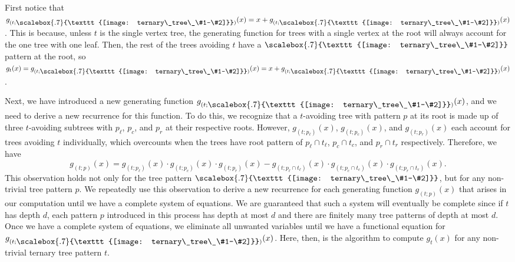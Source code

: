\documentclass[12pt]{article}
\newcommand{\st}[2]{\ensuremath{\vcenter{\hbox{\scalebox{.7}{\texttt{[image: ternary\_tree\_\#1-\#2]}}}}}}
\begin{document}
First notice that $g_{(t; \st{1}{1})}(x) = x + g_{(t;\st{3}{1})}(x)$. This is because, unless $t$ is the single vertex tree, the generating function for trees with a single vertex at the root will always account for the one tree with one leaf.  Then, the rest of the trees avoiding $t$ have a \st{3}{1} pattern at the root, so $g_t(x)=g_{(t; \st{1}{1})}(x) = x + g_{(t;\st{3}{1})}(x)$.

Next, we have introduced a new generating function $g_{(t;\st{3}{1})}(x)$, and we need to derive a new recurrence for this function. To do this, we recognize that a $t$-avoiding tree with pattern $p$ at its root is made up of three $t$-avoiding subtrees with $p_\ell$, $p_c$, and $p_r$ at their respective roots. However, $g_{(t;p_\ell )}(x)$, $g_{(t;p_c)}(x)$, and $g_{(t;p_r)}(x)$ each account for trees avoiding $t$ individually, which overcounts when the trees have root pattern of $p_\ell \cap t_\ell$, $p_c \cap t_c$, and $p_r \cap t_r$ respectively. Therefore, we have $$g_{(t;p)}(x)= g_{(t;p_\ell)}(x) \cdot g_{(t;p_c)}(x) \cdot g_{(t;p_r)}(x) - g_{(t;p_\ell \cap t_\ell)}(x) \cdot g_{(t; p_c \cap t_c)}(x) \cdot g_{(t; p_r \cap t_r)}(x).$$  This observation holds not only for the tree pattern \st{3}{1}, but for any non-trivial tree pattern $p$.  We repeatedly use this observation to derive a new recurrence for each generating function $g_{(t;p)}(x)$ that arises in our computation until we have a complete system of equations.  We are guaranteed that such a system will eventually be complete since if $t$ has depth $d$, each pattern $p$ introduced in this process has depth at most $d$ and there are finitely many tree patterns of depth at most $d$.  Once we have a complete system of equations, we eliminate all unwanted variables until we have a functional equation for $g_{(t;\st{1}{1})}(x)$. Here, then, is the algorithm to compute $g_t(x)$ for any non-trivial ternary tree pattern $t$.
\end{document}
